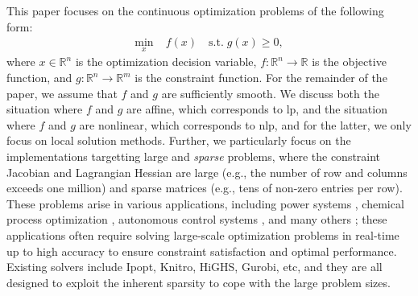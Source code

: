 \documentclass{article}
\begin{document}
This paper focuses on the continuous optimization problems of the following form:
\begin{align}\label{eqn:opt}
  \min_{x } \; & f(x) \quad \text{s.t.} \; g(x) \geq 0,
\end{align}
where $x \in \mathbb{R}^n$ is the optimization decision variable, $f: \mathbb{R}^n \to \mathbb{R}$ is the objective function, and $g: \mathbb{R}^n \to \mathbb{R}^m$ is the constraint function.
For the remainder of the paper, we assume that $f$ and $g$ are sufficiently smooth.
We discuss both the situation where $f$ and $g$ are affine, which corresponds to \gls{lp}, and the situation where $f$ and $g$ are nonlinear, which corresponds to \gls{nlp}, and for the latter, we only focus on local solution methods.
Further, we particularly focus on the implementations targetting large and \emph{sparse} problems, where the constraint Jacobian and Lagrangian Hessian are large (e.g., the number of row and columns exceeds one million) and sparse matrices (e.g., tens of non-zero entries per row).
These problems arise in various applications, including power systems \cite{}, chemical process optimization \cite{}, autonomous control systems \cite{}, and many others \cite{}; these applications often require solving large-scale optimization problems in real-time up to high accuracy to ensure constraint satisfaction and optimal performance.
Existing solvers include Ipopt, Knitro, HiGHS, Gurobi, etc, and they are all designed to exploit the inherent sparsity to cope with the large problem sizes.
\end{document}
